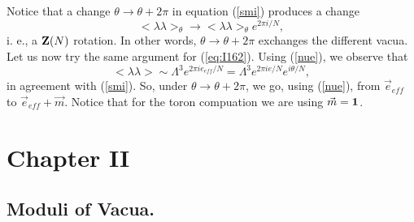 Notice that a change $\theta \rightarrow \theta + 2 \pi$ in
equation (\ref{smi}) produces a change 
\begin{equation}
<\lambda \lambda>_{\theta} \rightarrow <\lambda \lambda>_{\theta}
e^{2\pi i/N},
\end{equation}
i. e., a ${\bf Z}(N)$ rotation. In other words, $\theta
\rightarrow \theta + 2 \pi$ exchanges the different vacua. Let us
now try the same argument for (\ref{eq:I162}). Using (\ref{nue}),
we observe that
\begin{equation}
<\lambda \lambda> \sim \Lambda^3 e^{2 \pi i e_{eff}/N} =
\Lambda^3 e^{2 \pi i e/N} e^{i \theta/N},
\end{equation}
in agreement with (\ref{smi}). So, under $\theta \rightarrow
\theta + 2 \pi$, we go, using (\ref{nue}), from $\vec{e}_{eff}$
to $\vec{e}_{eff}+ \vec{m}$. Notice that for the toron compuation
we are using $\vec{m}={\bf 1}$.




\section{Chapter II}

\subsection{Moduli of Vacua.}

